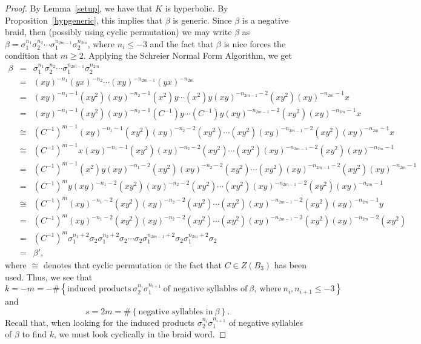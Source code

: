 \documentclass{article}
\begin{document}
\begin{proof} By Lemma~\ref{setup}, we have that $K$ is hyperbolic. By Proposition~\ref{hypgeneric}, this implies that $\beta$ is generic. Since $\beta$ is a negative braid, then (possibly using cyclic permutation) we may write $\beta$ as $\beta=\sigma_{1}^{n_{1}}\sigma_{2}^{n_{2}}\cdots\sigma_{1}^{n_{2m-1}}\sigma_{2}^{n_{2m}}$, where $n_{i} \leq -3$ and the fact that $\beta$ is nice forces the condition that $m \geq 2$. Applying the Schreier Normal Form Algorithm, we get
\begin{eqnarray*}
\beta & = & \sigma_{1}^{n_{1}}\sigma_{2}^{n_{2}}\cdots\sigma_{1}^{n_{2m-1}}\sigma_{2}^{n_{2m}}\\
\ & = & (xy)^{-n_{1}}(yx)^{-n_{2}}\cdots(xy)^{-n_{2m-1}}(yx)^{-n_{2m}}\\ 
\ & = & (xy)^{-n_{1}-1}(xy^{2})(xy)^{-n_{2}-1}(x^{2})y\cdots(x^{2})y(xy)^{-n_{2m-1}-2}(xy^{2})(xy)^{-n_{2m}-1}x\\ 
\ & = & (xy)^{-n_{1}-1}(xy^{2})(xy)^{-n_{2}-1}(C^{-1})y\cdots(C^{-1})y(xy)^{-n_{2m-1}-2}(xy^{2})(xy)^{-n_{2m}-1}x\\ 
\ & \cong & (C^{-1})^{m-1}(xy)^{-n_{1}-1}(xy^{2})(xy)^{-n_{2}-2}(xy^{2})\cdots(xy^{2})(xy)^{-n_{2m-1}-2}(xy^{2})(xy)^{-n_{2m}-1}x\\ 
\ & \cong & (C^{-1})^{m-1}x(xy)^{-n_{1}-1}(xy^{2})(xy)^{-n_{2}-2}(xy^{2})\cdots(xy^{2})(xy)^{-n_{2m-1}-2}(xy^{2})(xy)^{-n_{2m}-1}\\ 
\ & = & (C^{-1})^{m-1}(x^{2})y(xy)^{-n_{1}-2}(xy^{2})(xy)^{-n_{2}-2}(xy^{2})\cdots(xy^{2})(xy)^{-n_{2m-1}-2}(xy^{2})(xy)^{-n_{2m}-1}\\ 
\ & = & (C^{-1})^{m}y(xy)^{-n_{1}-2}(xy^{2})(xy)^{-n_{2}-2}(xy^{2})\cdots(xy^{2})(xy)^{-n_{2m-1}-2}(xy^{2})(xy)^{-n_{2m}-1}\\ 
\ & \cong & (C^{-1})^{m}(xy)^{-n_{1}-2}(xy^{2})(xy)^{-n_{2}-2}(xy^{2})\cdots(xy^{2})(xy)^{-n_{2m-1}-2}(xy^{2})(xy)^{-n_{2m}-1}y\\ 
\ & = & (C^{-1})^{m}(xy)^{-n_{1}-2}(xy^{2})(xy)^{-n_{2}-2}(xy^{2})\cdots(xy^{2})(xy)^{-n_{2m-1}-2}(xy^{2})(xy)^{-n_{2m}-2}(xy^{2})\\ 
\ & = & (C^{-1})^{m}\sigma_{1}^{n_{1}+2}\sigma_{2}\sigma_{1}^{n_{2}+2}\sigma_{2}\cdots\sigma_{2}\sigma_{1}^{n_{2m-1}+2}\sigma_{2}\sigma_{1}^{n_{2m}+2}\sigma_{2}\\
\ & = & \beta', 
\end{eqnarray*}
\noindent where $\cong$ denotes that cyclic permutation or the fact that $C \in Z(B_{3})$ has been used. Thus, we see that
$$k=-m=-\# \left\{\text{induced\ products}\ \sigma_{2}^{n_{i}}\sigma_{1}^{n_{i+1}}\ \text{of\ negative\ syllables\ of}\ \beta,\ \text{where}\ n_{i}, n_{i+1} \leq -3 \right\}$$
\noindent and
$$s=2m=\#\left\{\text{negative\ syllables\ in}\ \beta \right\}.$$
\noindent Recall that, when looking for the induced products $\sigma_{2}^{n_{i}}\sigma_{1}^{n_{i+1}}$ of negative syllables of $\beta$ to find $k$, we must look cyclically in the braid word. 
\end{proof}
\end{document}
